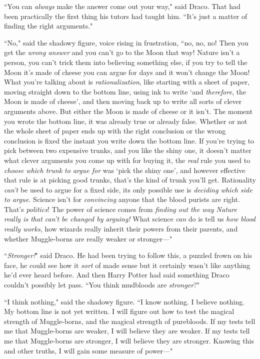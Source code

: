``You can \emph{always} make the answer come out your way," said Draco. That had been practically the first thing his tutors had taught him. ``It's just a matter of finding the right arguments."

``No," said the shadowy figure, voice rising in frustration, ``no, no, no! Then you get the \emph{wrong answer} and you can't go to the Moon that way! Nature isn't a person, you can't trick them into believing something else, if you try to tell the Moon it's made of cheese you can argue for days and it won't change the Moon! What you're talking about is \emph{rationalization}, like starting with a sheet of paper, moving straight down to the bottom line, using ink to write `and \emph{therefore}, the Moon is made of cheese', and then moving back up to write all sorts of clever arguments above. But either the Moon is made of cheese or it isn't. The moment you wrote the bottom line, it was already true or already false. Whether or not the whole sheet of paper ends up with the right conclusion or the wrong conclusion is fixed the instant you write down the bottom line. If you're trying to pick between two expensive trunks, and you like the shiny one, it doesn't matter what clever arguments you come up with for buying it, the \emph{real} rule you used to \emph{choose which trunk to argue for} was `pick the shiny one', and however effective that rule is at picking good trunks, that's the kind of trunk you'll get. Rationality \emph{can't} be used to argue for a fixed side, its only possible use is \emph{deciding which side to argue}. Science isn't for \emph{convincing} anyone that the blood purists are right. That's \emph{politics}! The power of science comes from \emph{finding out the way Nature really is that can't be changed by arguing!} What science \emph{can} do is tell us \emph{how blood really works}, how wizards really inherit their powers from their parents, and whether Muggle-borns are really weaker or stronger—"

``\emph{Stronger!}" said Draco. He had been trying to follow this, a puzzled frown on his face, he could see how it \emph{sort} of made sense but it certainly wasn't like anything he'd ever heard before. And then Harry Potter had said something Draco couldn't possibly let pass. ``You think mudbloods are \emph{stronger}?"

``I think nothing," said the shadowy figure. ``I know nothing. I believe nothing. My bottom line is not yet written. I will figure out how to test the magical strength of Muggle-borns, and the magical strength of purebloods. If my tests tell me that Muggle-borns are weaker, I will believe they are weaker. If my tests tell me that Muggle-borns are stronger, I will believe they are stronger. Knowing this and other truths, I will gain some measure of power—"

